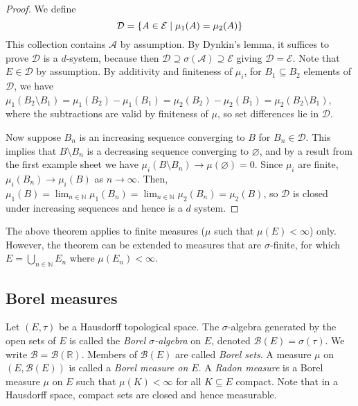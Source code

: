 \begin{proof}
	We define
	\[ \mathcal D = \qty{A \in \mathcal E \mid \mu_1(A) = \mu_2(A)} \]
	This collection contains \( \mathcal A \) by assumption.
	By Dynkin's lemma, it suffices to prove \( \mathcal D \) is a \( d \)-system, because then \( \mathcal D \supseteq \sigma(\mathcal A) \supseteq \mathcal E \) giving \( \mathcal D = \mathcal E \).
	Note that \( E \in \mathcal D \) by assumption.
	By additivity and finiteness of \( \mu_i \), for \( B_1 \subseteq B_2 \) elements of \( \mathcal D \), we have \( \mu_1(B_2 \setminus B_1) = \mu_1(B_2) - \mu_1(B_1) = \mu_2(B_2) - \mu_2(B_1) = \mu_2(B_2 \setminus B_1) \), where the subtractions are valid by finiteness of \( \mu \), so set differences lie in \( \mathcal D \).

	Now suppose \( B_n \) is an increasing sequence converging to \( B \) for \( B_n \in \mathcal D \).
	This implies that \( B \setminus B_n \) is a decreasing sequence converging to \( \varnothing \), and by a result from the first example sheet we have \( \mu_i(B \setminus B_n) \to \mu(\varnothing) = 0 \).
	Since \( \mu_i \) are finite, \( \mu_i(B_n) \to \mu_i(B) \) as \( n \to \infty \).
	Then, \( \mu_1(B) = \lim_{n \in \mathbb N} \mu_1(B_n) = \lim_{n \in \mathbb N} \mu_2(B_n) = \mu_2(B) \), so \( \mathcal D \) is closed under increasing sequences and hence is a \( d \) system.
\end{proof}
\begin{remark}
	The above theorem applies to finite measures (\( \mu \) such that \( \mu(E) < \infty \)) only.
	However, the theorem can be extended to measures that are \( \sigma \)-finite, for which \( E = \bigcup_{n \in \mathbb N} E_n \) where \( \mu(E_n) < \infty \).
\end{remark}

\subsection{Borel measures}
\begin{definition}
	Let \( (E, \tau) \) be a Hausdorff topological space.
	The \( \sigma \)-algebra generated by the open sets of \( E \) is called the \emph{Borel \( \sigma \)-algebra} on \( E \), denoted \( \mathcal B(E) = \sigma(\tau) \).
	We write \( \mathcal B = \mathcal B(\mathbb R) \).
	Members of \( \mathcal B(E) \) are called \emph{Borel sets}.
	A measure \( \mu \) on \( (E, \mathcal B(E)) \) is called a \emph{Borel measure on \( E \)}.
	A \emph{Radon measure} is a Borel measure \( \mu \) on \( E \) such that \( \mu(K) < \infty \) for all \( K \subseteq E \) compact.
	Note that in a Hausdorff space, compact sets are closed and hence measurable.
\end{definition}

